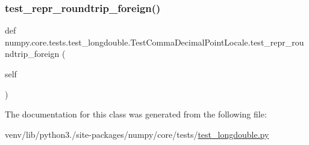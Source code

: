 \subsubsection{\texorpdfstring{test\+\_\+repr\+\_\+roundtrip\+\_\+foreign()}{test\_repr\_roundtrip\_foreign()}}
{\footnotesize\ttfamily def numpy.\+core.\+tests.\+test\+\_\+longdouble.\+Test\+Comma\+Decimal\+Point\+Locale.\+test\+\_\+repr\+\_\+roundtrip\+\_\+foreign (\begin{DoxyParamCaption}\item[{}]{self }\end{DoxyParamCaption})}



The documentation for this class was generated from the following file\+:\begin{DoxyCompactItemize}
\item 
venv/lib/python3./site-\/packages/numpy/core/tests/\hyperlink{test__longdouble_8py}{test\+\_\+longdouble.\+py}\end{DoxyCompactItemize}

